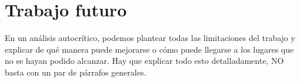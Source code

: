 \chapter{Trabajo futuro}
En un análisis autocrítico, podemos plantear todas las limitaciones del trabajo y explicar de qué manera puede mejorarse o cómo puede llegarse a los lugares que no se hayan podido alcanzar. Hay que explicar todo esto detalladamente, NO basta con un par de párrafos generales.